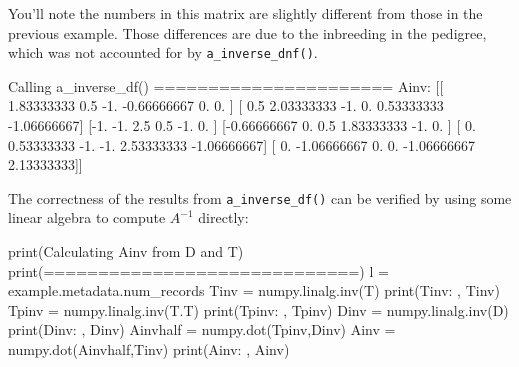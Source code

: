 \documentclass[
  letterpaper,
  DIV=11,
  numbers=noendperiod]{scrreprt}
\newenvironment{Shaded}{\begin{snugshade}}{\end{snugshade}}
\newcommand{\BuiltInTok}[1]{\textcolor[rgb]{0.00,0.23,0.31}{#1}}
\newcommand{\FloatTok}[1]{\textcolor[rgb]{0.68,0.00,0.00}{#1}}
\newcommand{\NormalTok}[1]{\textcolor[rgb]{0.00,0.23,0.31}{#1}}
\newcommand{\OperatorTok}[1]{\textcolor[rgb]{0.37,0.37,0.37}{#1}}
\newcommand{\StringTok}[1]{\textcolor[rgb]{0.13,0.47,0.30}{#1}}
\begin{document}
You'll note the numbers in this matrix are slightly different from those
in the previous example. Those differences are due to the inbreeding in
the pedigree, which was not accounted for by \texttt{a\_inverse\_dnf()}.

\begin{Shaded}
\begin{Highlighting}[]
\NormalTok{Calling a\_inverse\_df()}
\OperatorTok{======================}
\NormalTok{Ainv:  [[ }\FloatTok{1.83333333}  \FloatTok{0.5}        \OperatorTok{{-}}\FloatTok{1.}         \OperatorTok{{-}}\FloatTok{0.66666667}  \FloatTok{0.}          \FloatTok{0.}\NormalTok{        ]}
\NormalTok{ [ }\FloatTok{0.5}         \FloatTok{2.03333333} \OperatorTok{{-}}\FloatTok{1.}          \FloatTok{0.}          \FloatTok{0.53333333} \OperatorTok{{-}}\FloatTok{1.06666667}\NormalTok{]}
\NormalTok{ [}\OperatorTok{{-}}\FloatTok{1.}         \OperatorTok{{-}}\FloatTok{1.}          \FloatTok{2.5}         \FloatTok{0.5}        \OperatorTok{{-}}\FloatTok{1.}          \FloatTok{0.}\NormalTok{        ]}
\NormalTok{ [}\OperatorTok{{-}}\FloatTok{0.66666667}  \FloatTok{0.}          \FloatTok{0.5}         \FloatTok{1.83333333} \OperatorTok{{-}}\FloatTok{1.}          \FloatTok{0.}\NormalTok{        ]}
\NormalTok{ [ }\FloatTok{0.}          \FloatTok{0.53333333} \OperatorTok{{-}}\FloatTok{1.}         \OperatorTok{{-}}\FloatTok{1.}          \FloatTok{2.53333333} \OperatorTok{{-}}\FloatTok{1.06666667}\NormalTok{]}
\NormalTok{ [ }\FloatTok{0.}         \OperatorTok{{-}}\FloatTok{1.06666667}  \FloatTok{0.}          \FloatTok{0.}         \OperatorTok{{-}}\FloatTok{1.06666667}  \FloatTok{2.13333333}\NormalTok{]]}
\end{Highlighting}
\end{Shaded}

The correctness of the results from \texttt{a\_inverse\_df()} can be
verified by using some linear algebra to compute \(A^{-1}\) directly:

\begin{Shaded}
\begin{Highlighting}[]
\BuiltInTok{print}\NormalTok{(}\StringTok{\textquotesingle{}Calculating Ainv from D and T\textquotesingle{}}\NormalTok{)}
\BuiltInTok{print}\NormalTok{(}\StringTok{\textquotesingle{}=============================\textquotesingle{}}\NormalTok{)}
\NormalTok{l }\OperatorTok{=}\NormalTok{ example.metadata.num\_records}
\NormalTok{Tinv }\OperatorTok{=}\NormalTok{ numpy.linalg.inv(T)}
\BuiltInTok{print}\NormalTok{(}\StringTok{\textquotesingle{}Tinv: \textquotesingle{}}\NormalTok{, Tinv)}
\NormalTok{Tpinv }\OperatorTok{=}\NormalTok{ numpy.linalg.inv(T.T)}
\BuiltInTok{print}\NormalTok{(}\StringTok{\textquotesingle{}Tpinv: \textquotesingle{}}\NormalTok{, Tpinv)}
\NormalTok{Dinv }\OperatorTok{=}\NormalTok{ numpy.linalg.inv(D)}
\BuiltInTok{print}\NormalTok{(}\StringTok{\textquotesingle{}Dinv: \textquotesingle{}}\NormalTok{, Dinv)}
\NormalTok{Ainvhalf }\OperatorTok{=}\NormalTok{ numpy.dot(Tpinv,Dinv)}
\NormalTok{Ainv }\OperatorTok{=}\NormalTok{ numpy.dot(Ainvhalf,Tinv)}
\BuiltInTok{print}\NormalTok{(}\StringTok{\textquotesingle{}Ainv: \textquotesingle{}}\NormalTok{, Ainv)}
\end{Highlighting}
\end{Shaded}
\end{document}
